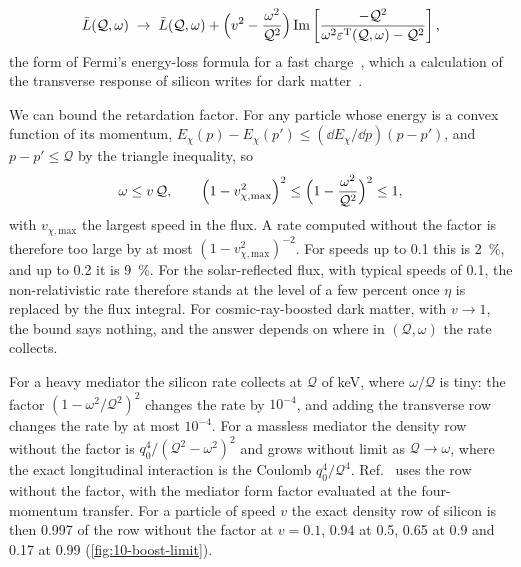 \begin{equation}
  \bar L(\mathcal{Q},\omega) \;\to\; \bar L(\mathcal{Q},\omega) + \Bigl(v^2 - \frac{\omega^2}{\mathcal{Q}^2}\Bigr)\operatorname{Im}\left[\frac{-\mathcal{Q}^2}{\omega^2\varepsilon^{\mathrm{T}}(\mathcal{Q},\omega) - \mathcal{Q}^2}\right] ,
  \label{eq:10.9-fermi}
\end{equation}
the form of Fermi's energy-loss formula for a fast charge~\cite{fermi1940ionization}, which a calculation of the transverse response of silicon writes for dark matter~\cite[Eq.~(2)]{liang2026dielectric}.

We can bound the retardation factor. For any particle whose energy is a convex function of its momentum, $E_\chi(p) - E_\chi(p') \le (\dd E_\chi/\dd p)(p - p')$, and $p - p' \le \mathcal{Q}$ by the triangle inequality, so
\begin{equation}
  \omega \le v\,\mathcal{Q} , \qquad \Bigl(1 - v_{\chi,\mathrm{max}}^2\Bigr)^2 \le \Bigl(1 - \frac{\omega^2}{\mathcal{Q}^2}\Bigr)^2 \le 1 ,
  \label{eq:10.9-bound}
\end{equation}
with $v_{\chi,\mathrm{max}}$ the largest speed in the flux. A rate computed without the factor is therefore too large by at most $(1 - v_{\chi,\mathrm{max}}^2)^{-2}$. For speeds up to 0.1 this is \SI{2}{\percent}, and up to 0.2 it is \SI{9}{\percent}. For the solar-reflected flux, with typical speeds of 0.1, the non-relativistic rate therefore stands at the level of a few percent once $\eta$ is replaced by the flux integral. For cosmic-ray-boosted dark matter, with $v \to 1$, the bound says nothing, and the answer depends on where in $(\mathcal{Q},\omega)$ the rate collects.

For a heavy mediator the silicon rate collects at $\mathcal{Q}$ of keV, where $\omega/\mathcal{Q}$ is tiny: the factor $(1 - \omega^2/\mathcal{Q}^2)^2$ changes the rate by $10^{-4}$, and adding the transverse row changes the rate by at most $10^{-4}$. For a massless mediator the density row without the factor is $q_0^4/(\mathcal{Q}^2 - \omega^2)^2$ and grows without limit as $\mathcal{Q} \to \omega$, where the exact longitudinal interaction is the Coulomb $q_0^4/\mathcal{Q}^4$. Ref.~\cite[Eqs.~(4)--(6)]{liang2025plasmon} uses the row without the factor, with the mediator form factor evaluated at the four-momentum transfer. For a particle of speed $v$ the exact density row of silicon is then 0.997 of the row without the factor at $v = 0.1$, 0.94 at 0.5, 0.65 at 0.9 and 0.17 at 0.99 (\cref{fig:10-boost-limit}).

